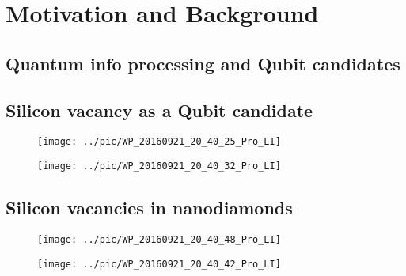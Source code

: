 
\chapter[Motivation and Background]
{Motivation and Background} %

\label{Chapter1} %


\newcommand{\keyword}[1]{\textbf{#1}}
\newcommand{\tabhead}[1]{\textbf{#1}}
\newcommand{\code}[1]{\texttt{#1}}
\newcommand{\file}[1]{\texttt{\bfseries#1}}
\newcommand{\option}[1]{\texttt{\itshape#1}}


\section[Quantum info processing and Qubit candidates]{Quantum info processing and Qubit candidates}



\section[Silicon vacancy as a Qubit candidate]{Silicon vacancy as a Qubit candidate}
\begin{figure}[h]
\centering
\texttt{[image: ../pic/WP\_20160921\_20\_40\_25\_Pro\_LI]}
\caption{}
\label{fig:wp20160921204025proli}
\end{figure}
\begin{figure}[h]
\centering
\texttt{[image: ../pic/WP\_20160921\_20\_40\_32\_Pro\_LI]}
\caption{}
\label{fig:wp20160921204032proli}
\end{figure}


\section[Silicon vacancies in nanodiamonds]{Silicon vacancies in nanodiamonds}
\begin{figure}[h]
\centering
\texttt{[image: ../pic/WP\_20160921\_20\_40\_48\_Pro\_LI]}
\caption{}
\label{fig:wp20160921204048proli}
\end{figure}
\begin{figure}[h]
\centering
\texttt{[image: ../pic/WP\_20160921\_20\_40\_42\_Pro\_LI]}
\caption{}
\label{fig:wp20160921204042proli}
\end{figure}


